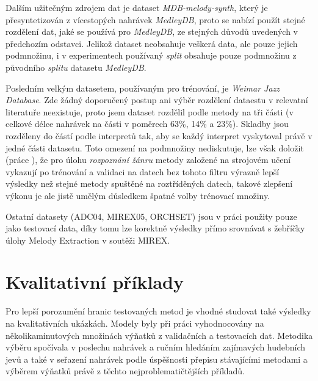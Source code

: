 Dalším užitečným zdrojem dat je dataset \textit{MDB-melody-synth}, který je přesyntetizován z vícestopých nahrávek \textit{MedleyDB}, proto se nabízí použít stejné rozdělení dat, jaké se používá pro \textit{MedleyDB}, ze stejných důvodů uvedených v předchozím odstavci. Jelikož dataset neobsahuje veškerá data, ale pouze jejich podmnožinu, i v experimentech používaný \textit{split} obsahuje pouze podmnožinu z původního \textit{splitu} datasetu \textit{MedleyDB}. 

Posledním velkým datasetem, používaným pro trénování, je \textit{Weimar Jazz Database}. Zde žádný doporučený postup ani výběr rozdělení dataestu v relevatní literatuře neexistuje, proto jsem dataset rozdělil podle metody \cite{Bittner2017} na tři části (v celkové délce nahrávek na části v poměrech 63\%, 14\% a 23\%). Skladby jsou rozděleny do částí podle interpretů tak, aby se každý interpret vyskytoval právě v jedné části datasetu. Toto omezení na podmnožiny \cite{Bittner2017} nediskutuje, lze však doložit (práce \cite{Sturm2013}), že pro úlohu \textit{rozpoznání žánru} metody založené na strojovém učení vykazují po trénování a validaci na datech bez tohoto filtru výrazně lepší výsledky než stejné metody spuštěné na roztříděných datech, takové zlepšení výkonu je ale jistě umělým důsledkem špatné volby trénovací množiny. 

Ostatní datasety (ADC04, MIREX05, ORCHSET) jsou v práci použity pouze jako testovací data, díky tomu lze korektně výsledky přímo srovnávat s žebříčky úlohy Melody Extraction v soutěži MIREX.



\section{Kvalitativní příklady}

Pro lepší porozumění hranic testovaných metod je vhodné studovat také výsledky na kvalitativních ukázkách. Modely byly při práci vyhodnocovány na několikaminutových množinách výňatků z validačních a testovacích dat. Metodika výběru spočívala v poslechu nahrávek a ručním hledáním zajímavých hudebních jevů a také v seřazení nahrávek podle úspěšnosti přepisu stávajícími metodami a výběrem výňatků právě z těchto nejproblematičtějších příkladů.


